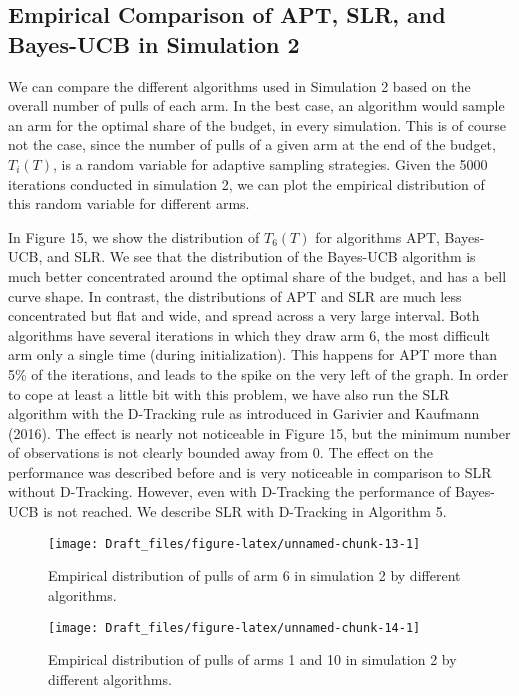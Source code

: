 \documentclass[11pt,]{article}
\begin{document}
\subsection{Empirical Comparison of APT, SLR, and Bayes-UCB in
Simulation
2}\label{empirical-comparison-of-apt-slr-and-bayes-ucb-in-simulation-2}

We can compare the different algorithms used in Simulation 2 based on
the overall number of pulls of each arm. In the best case, an algorithm
would sample an arm for the optimal share of the budget, in every
simulation. This is of course not the case, since the number of pulls of
a given arm at the end of the budget, \(T_i(T)\), is a random variable
for adaptive sampling strategies. Given the 5000 iterations conducted in
simulation 2, we can plot the empirical distribution of this random
variable for different arms.

In Figure 15, we show the distribution of \(T_6(T)\) for algorithms APT,
Bayes-UCB, and SLR. We see that the distribution of the Bayes-UCB
algorithm is much better concentrated around the optimal share of the
budget, and has a bell curve shape. In contrast, the distributions of
APT and SLR are much less concentrated but flat and wide, and spread
across a very large interval. Both algorithms have several iterations in
which they draw arm 6, the most difficult arm only a single time (during
initialization). This happens for APT more than 5\% of the iterations,
and leads to the spike on the very left of the graph. In order to cope
at least a little bit with this problem, we have also run the SLR
algorithm with the D-Tracking rule as introduced in Garivier and
Kaufmann (2016). The effect is nearly not noticeable in Figure 15, but
the minimum number of observations is not clearly bounded away from 0.
The effect on the performance was described before and is very
noticeable in comparison to SLR without D-Tracking. However, even with
D-Tracking the performance of Bayes-UCB is not reached. We describe SLR
with D-Tracking in Algorithm 5.

\begin{figure}

{\centering \texttt{[image: Draft\_files/figure-latex/unnamed-chunk-13-1]} 

}

\caption{Empirical distribution of pulls of arm 6 in simulation 2 by different algorithms.}\label{fig:unnamed-chunk-13}
\end{figure}

\begin{figure}

{\centering \texttt{[image: Draft\_files/figure-latex/unnamed-chunk-14-1]} 

}

\caption{Empirical distribution of pulls of arms 1 and 10 in simulation 2 by different algorithms.}\label{fig:unnamed-chunk-14}
\end{figure}
\end{document}
